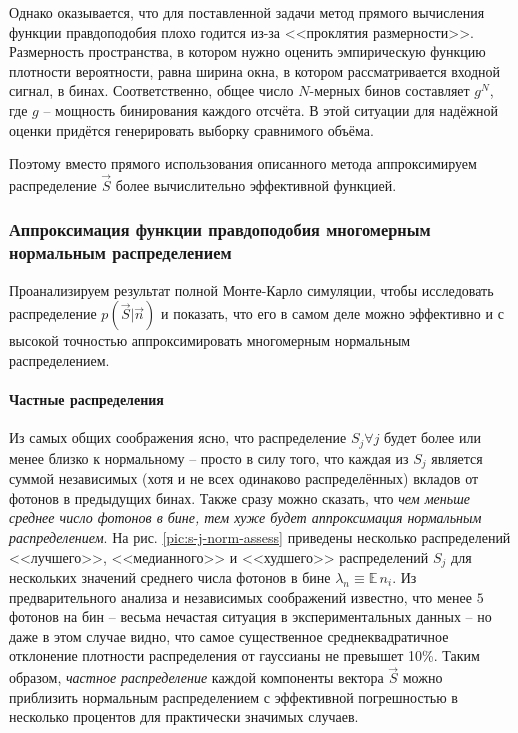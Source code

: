 \documentclass[12pt]{book}
\begin{document}
	Однако оказывается, что для поставленной задачи метод прямого вычисления функции правдоподобия плохо годится из-за <<проклятия размерности>>. Размерность пространства, в котором нужно оценить эмпирическую функцию плотности вероятности, равна ширина окна, в котором рассматривается входной сигнал, в бинах. Соответственно, общее число $N$-мерных бинов составляет $g^{N}$, где $g$ -- мощность бинирования каждого отсчёта. В этой ситуации для надёжной оценки придётся генерировать выборку сравнимого объёма.
	
	Поэтому вместо прямого использования описанного метода аппроксимируем распределение $\vec{S}$ более вычислительно эффективной функцией.

	\subsubsection{Аппроксимация функции правдоподобия многомерным нормальным распределением}
	
	\label{sec:likelihood-as-multivar-normal}
	
	Проанализируем результат полной Монте-Карло симуляции, чтобы исследовать распределение $p(\vec{S} | \vec{n})$ и показать, что его в самом деле можно эффективно и с высокой точностью аппроксимировать многомерным нормальным распределением.
	
	\paragraph{Частные распределения}

	Из самых общих соображения ясно, что распределение $S_j \forall j$ будет более или менее близко к нормальному -- просто в силу того, что каждая из $S_j$ является суммой независимых (хотя и не всех одинаково распределённых) вкладов от фотонов в предыдущих бинах. Также сразу можно сказать, что \textit{чем меньше среднее число фотонов в бине, тем хуже будет аппроксимация нормальным распределением}. На рис. \ref{pic:s-j-norm-assess} приведены несколько распределений <<лучшего>>, <<медианного>> и <<худшего>> распределений $S_j$ для нескольких значений среднего числа фотонов в бине $\lambda_n \equiv \mathbb{E} \, n_i$. Из предварительного анализа и независимых соображений известно, что менее $5$ фотонов на бин -- весьма нечастая ситуация в экспериментальных данных -- но даже в этом случае видно, что самое существенное среднеквадратичное отклонение плотности распределения от гауссианы не превышет 10\%. Таким образом, \textit{частное распределение} каждой компоненты вектора $\vec{S}$ можно приблизить нормальным распределением с эффективной погрешностью в несколько процентов для практически значимых случаев.
	
\end{document}
